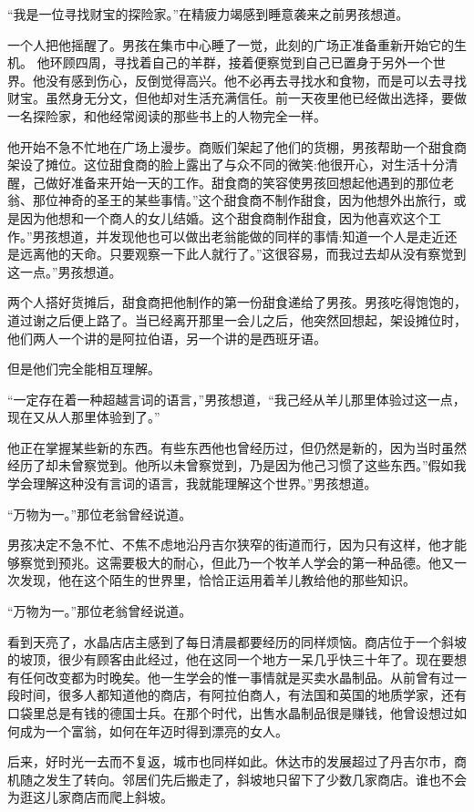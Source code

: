 \documentclass[twoside,openany]{book}
\begin{document}
“我是一位寻找财宝的探险家。”在精疲力竭感到睡意袭来之前男孩想道。

一个人把他摇醒了。男孩在集市中心睡了一觉，此刻的广场正准备重新开始它的生机。 他环顾四周，寻找着自己的羊群，接着便察觉到自己已置身于另外一个世界。他没有感到伤心，反倒觉得高兴。他不必再去寻找水和食物，而是可以去寻找财宝。虽然身无分文，但他却对生活充满信任。前一天夜里他已经做出选择，要做一名探险家，和他经常阅读的那些书上的人物完全一样。

他开始不急不忙地在广场上漫步。商贩们架起了他们的货棚，男孩帮助一个甜食商架设了摊位。这位甜食商的脸上露出了与众不同的微笑:他很开心，对生活十分清醒，己做好准备来开始一天的工作。甜食商的笑容使男孩回想起他遇到的那位老翁、那位神奇的圣王的某些事情。”这个甜食商不制作甜食，因为他想外出旅行，或是因为他想和一个商人的女儿结婚。这个甜食商制作甜食，因为他喜欢这个工作。”男孩想道，并发现他也可以做出老翁能做的同样的事情:知道一个人是走近还是远离他的天命。只要观察一下此人就行了。”这很容易，而我过去却从没有察觉到这一点。”男孩想道。

两个人搭好货摊后，甜食商把他制作的第一份甜食递给了男孩。男孩吃得饱饱的，道过谢之后便上路了。当已经离开那里一会儿之后，他突然回想起，架设摊位时，他们两人一个讲的是阿拉伯语，另一个讲的是西班牙语。

但是他们完全能相互理解。

“一定存在着一种超越言词的语言，”男孩想道，“我己经从羊儿那里体验过这一点，现在又从人那里体验到了。”

他正在掌握某些新的东西。有些东西他也曾经历过，但仍然是新的，因为当时虽然经历了却未曾察觉到。他所以未曾察觉到，乃是因为他己习惯了这些东西。”假如我学会理解这种没有言词的语言，我就能理解这个世界。”男孩想道。

“万物为一。”那位老翁曾经说道。

男孩决定不急不忙、不焦不虑地沿丹吉尔狭窄的街道而行，因为只有这样，他才能够察觉到预兆。这需要极大的耐心，但此乃一个牧羊人学会的第一种品德。他又一次发现，他在这个陌生的世界里，恰恰正运用着羊儿教给他的那些知识。

“万物为一。”那位老翁曾经说道。

看到天亮了，水晶店店主感到了每日清晨都要经历的同样烦恼。商店位于一个斜坡的坡顶，很少有顾客由此经过，他在这同一个地方一呆几乎快三十年了。现在要想有任何改变都为时晚矣。他一生学会的惟一事情就是买卖水晶制品。从前曾有过一段时间，很多人都知道他的商店，有阿拉伯商人，有法国和英国的地质学家，还有口袋里总是有钱的德国士兵。在那个时代，出售水晶制品很是赚钱，他曾设想过如何成为一个富翁，如何在年迈时得到漂亮的女人。

后来，好时光一去而不复返，城市也同样如此。休达市的发展超过了丹吉尔市，商机随之发生了转向。邻居们先后搬走了，斜坡地只留下了少数几家商店。谁也不会为逛这儿家商店而爬上斜坡。
\end{document}

